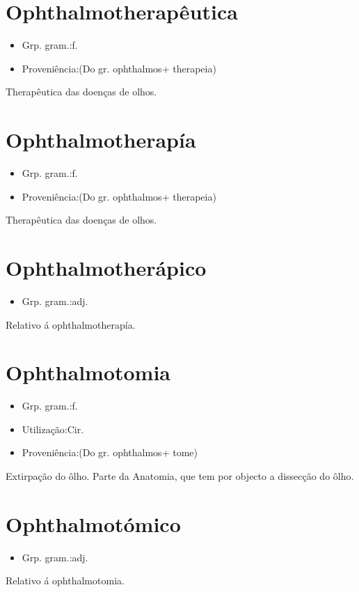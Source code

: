\section{Ophthalmotherapêutica}
\begin{itemize}
\item {Grp. gram.:f.}
\end{itemize}
\begin{itemize}
\item {Proveniência:(Do gr. \textunderscore ophthalmos\textunderscore  + \textunderscore therapeia\textunderscore )}
\end{itemize}
Therapêutica das doenças de olhos.
\section{Ophthalmotherapía}
\begin{itemize}
\item {Grp. gram.:f.}
\end{itemize}
\begin{itemize}
\item {Proveniência:(Do gr. \textunderscore ophthalmos\textunderscore  + \textunderscore therapeia\textunderscore )}
\end{itemize}
Therapêutica das doenças de olhos.
\section{Ophthalmotherápico}
\begin{itemize}
\item {Grp. gram.:adj.}
\end{itemize}
Relativo á ophthalmotherapía.
\section{Ophthalmotomia}
\begin{itemize}
\item {Grp. gram.:f.}
\end{itemize}
\begin{itemize}
\item {Utilização:Cir.}
\end{itemize}
\begin{itemize}
\item {Proveniência:(Do gr. \textunderscore ophthalmos\textunderscore  + \textunderscore tome\textunderscore )}
\end{itemize}
Extirpação do ôlho.
Parte da Anatomia, que tem por objecto a dissecção do ôlho.
\section{Ophthalmotómico}
\begin{itemize}
\item {Grp. gram.:adj.}
\end{itemize}
Relativo á ophthalmotomia.
